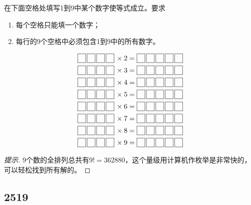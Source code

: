 \begin{example}
  在下面空格处填写1到9中某个数字使等式成立。要求
  \begin{enumerate}
  \item 每个空格只能填一个数字；
  \item 每行的9个空格中必须包含1到9中的所有数字。
  \end{enumerate}
  {
  \def\squarebox{\fbox{\phantom{9}}}
  \begin{align*}
    \squarebox\,\squarebox\,\squarebox\,\squarebox\,\times 2 ={}& \squarebox\,\squarebox\,\squarebox\,\squarebox\,\squarebox\\
    \squarebox\,\squarebox\,\squarebox\,\squarebox\,\times 3 ={}& \squarebox\,\squarebox\,\squarebox\,\squarebox\,\squarebox\\
    \squarebox\,\squarebox\,\squarebox\,\squarebox\,\times 4 ={}& \squarebox\,\squarebox\,\squarebox\,\squarebox\,\squarebox\\
    \squarebox\,\squarebox\,\squarebox\,\squarebox\,\times 5 ={}& \squarebox\,\squarebox\,\squarebox\,\squarebox\,\squarebox\\
    \squarebox\,\squarebox\,\squarebox\,\squarebox\,\times 6 ={}& \squarebox\,\squarebox\,\squarebox\,\squarebox\,\squarebox\\
    \squarebox\,\squarebox\,\squarebox\,\squarebox\,\times 7 ={}& \squarebox\,\squarebox\,\squarebox\,\squarebox\,\squarebox\\
    \squarebox\,\squarebox\,\squarebox\,\squarebox\,\times 8 ={}& \squarebox\,\squarebox\,\squarebox\,\squarebox\,\squarebox\\
    \squarebox\,\squarebox\,\squarebox\,\squarebox\,\times 9 ={}& \squarebox\,\squarebox\,\squarebox\,\squarebox\,\squarebox    
  \end{align*}
  }
\end{example}
\begin{proof}[提示]
  9个数的全排列总共有$9!=362880$，这个量级用计算机作枚举是非常快的，可以轻松找到所有解的。
\end{proof}


\subsection{2519}
\label{sec:number-2519}

